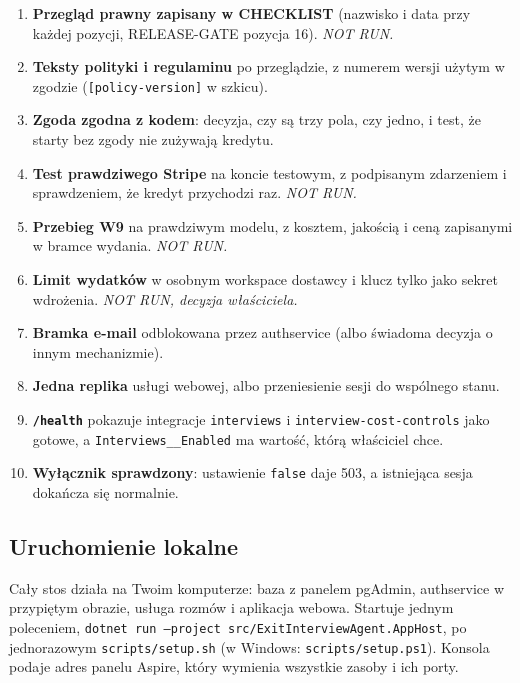 {\begin{enumerate}[leftmargin=*,itemsep=3pt]
  \item \textbf{Przegląd prawny zapisany w CHECKLIST} (nazwisko i data przy każdej
        pozycji, RELEASE-GATE pozycja 16). \emph{NOT RUN.}
  \item \textbf{Teksty polityki i regulaminu} po przeglądzie, z numerem wersji
        użytym w zgodzie (\texttt{[policy-version]} w szkicu).
  \item \textbf{Zgoda zgodna z kodem}: decyzja, czy są trzy pola, czy jedno,
        i test, że starty bez zgody nie zużywają kredytu.
  \item \textbf{Test prawdziwego Stripe} na koncie testowym, z podpisanym
        zdarzeniem i sprawdzeniem, że kredyt przychodzi raz. \emph{NOT RUN.}
  \item \textbf{Przebieg W9} na prawdziwym modelu, z kosztem, jakością i ceną
        zapisanymi w bramce wydania. \emph{NOT RUN.}
  \item \textbf{Limit wydatków} w osobnym workspace dostawcy i klucz tylko jako
        sekret wdrożenia. \emph{NOT RUN, decyzja właściciela.}
  \item \textbf{Bramka e-mail} odblokowana przez authservice (albo świadoma
        decyzja o innym mechanizmie).
  \item \textbf{Jedna replika} usługi webowej, albo przeniesienie sesji do
        wspólnego stanu.
  \item \textbf{\texttt{/health}} pokazuje integracje \texttt{interviews} i
        \texttt{interview-cost-controls} jako gotowe, a \texttt{Interviews\_\allowbreak{}\_\allowbreak{}Enabled}
        ma wartość, którą właściciel chce.
  \item \textbf{Wyłącznik sprawdzony}: ustawienie \texttt{false} daje 503, a
        istniejąca sesja dokańcza się normalnie.
\end{enumerate}

\subsection{Uruchomienie lokalne}

Cały stos działa na Twoim komputerze: baza z panelem pgAdmin, authservice w przypiętym obrazie, usługa rozmów i aplikacja webowa. Startuje jednym poleceniem, \texttt{dotnet run --project src/ExitInterviewAgent.AppHost}, po jednorazowym \texttt{scripts/setup.sh} (w Windows: \texttt{scripts/setup.ps1}). Konsola podaje adres panelu Aspire, który wymienia wszystkie zasoby i ich porty.

}
